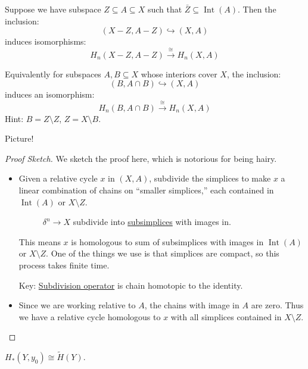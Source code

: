 \begin{theorem}[Excision]\label{thm:excision}
	Suppose we have subspace $Z \subseteq A \subseteq X$ such that $\bar{Z} \subseteq \operatorname{Int} (A)$. Then the inclusion:
	\[
		(X - Z, A - Z) \hookrightarrow (X, A)
	\]
	induces isomorphisms:
	\[
		H_n(X - Z, A - Z) \xrightarrow{\cong} H_n(X, A)
	\]
\end{theorem}

\begin{exercise}
	Equivalently for subspaces $A, B \subseteq X$ whose interiors cover $X$, the inclusion:
	\[
		(B, A \cap B) \hookrightarrow (X, A)
	\]
	induces an isomorphism:
	\[
		H_n(B, A \cap B) \xrightarrow{\cong} H_n(X, A)
	\]
	Hint: $B = Z \setminus Z$, $Z = X \setminus B$.
\end{exercise}
Picture!
\begin{figure}[H]
	\centering
	\label{fig:eg:excision-1}
\end{figure}

\begin{proof}[Proof Sketch]
	We sketch the proof here, which is notorious for being hairy.
	\begin{itemize}
		\item Given a relative cycle $x$ in $(X, A)$, subdivide the simplices to make $x$ a linear combination of chains on
		      ``smaller simplices,'' each contained in $\operatorname{Int}(A)$ or $X \setminus Z$.
		      \begin{figure}[H]
			      \centering
			      \caption{\(\delta ^n\to X\) subdivide into \hyperref[def:subsimplex]{subsimplices} with images in. }
			      \label{fig:pf:excision}
		      \end{figure}
		      This means $x$ is homologous to sum of subsimplices with images in $\operatorname{Int}(A)$ or $X \setminus Z$. One of the things we
		      use is that simplices are compact, so this process takes finite time.

		      Key: \underline{Subdivision operator} is chain homotopic to the identity.
		\item Since we are working relative to $A$, the chains with image in $A$ are zero. Thus we have a relative cycle homologous to $x$
		      with all simplices contained in $X \setminus Z$.
	\end{itemize}
\end{proof}

\begin{exercise}
	$H_\ast(Y, y_0) \cong \widetilde{H}(Y)$.
\end{exercise}

